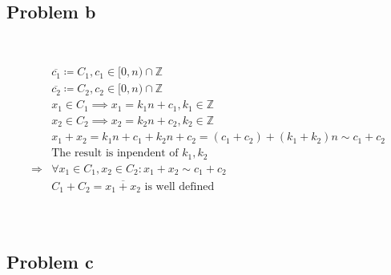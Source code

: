 \documentclass{article}
\begin{document}
~

\subsection*{Problem b}

~

\begin{equation*}
    \begin{split}
        &\overline{c_1}\coloneqq C_1,c_1\in[0,n)\cap\mathbb{Z}\\
        &\overline{c_2}\coloneqq C_2,c_2\in[0,n)\cap\mathbb{Z}\\
        &x_1\in C_1\implies x_1=k_1n+c_1,k_1\in \mathbb{Z} \\
        &x_2\in C_2\implies x_2=k_2n+c_2,k_2\in \mathbb{Z} \\
        &x_1+x_2=k_1n+c_1+k_2n+c_2=(c_1+c_2)+(k_1+k_2)n\sim c_1+c_2\\
        &\text{The result is inpendent of }k_1,k_2\\
        \Rightarrow&\forall x_1\in C_1,x_2\in C_2:x_1+x_2\sim c_1+c_2\\
        &C_1+C_2=\overline{x_1+x_2}\text { is well defined}\\
    \end{split}
\end{equation*}

~

\subsection*{Problem c}

~
\end{document}
